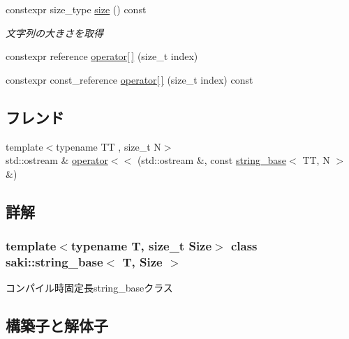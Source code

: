 \begin{DoxyCompactItemize}
\item 
constexpr size\+\_\+type \mbox{\hyperlink{classsaki_1_1string__base_ab243475d76d7abe879972787c590578e}{size}} () const
\begin{DoxyCompactList}\small\item\em 文字列の大きさを取得 \end{DoxyCompactList}\item 
constexpr reference \mbox{\hyperlink{classsaki_1_1string__base_acd4fb28d0f27242ecc038bab75018f3d}{operator\mbox{[}$\,$\mbox{]}}} (size\+\_\+t index)
\item 
constexpr const\+\_\+reference \mbox{\hyperlink{classsaki_1_1string__base_a738a15596baa6e6ade3322ce5dea9bea}{operator\mbox{[}$\,$\mbox{]}}} (size\+\_\+t index) const
\end{DoxyCompactItemize}
\subsection*{フレンド}
\begin{DoxyCompactItemize}
\item 
{\footnotesize template$<$typename TT , size\+\_\+t N$>$ }\\std\+::ostream \& \mbox{\hyperlink{classsaki_1_1string__base_af065456d5712bf52d3f09d973a6511ad}{operator$<$$<$}} (std\+::ostream \&, const \mbox{\hyperlink{classsaki_1_1string__base}{string\+\_\+base}}$<$ TT, N $>$ \&)
\end{DoxyCompactItemize}


\subsection{詳解}
\subsubsection*{template$<$typename T, size\+\_\+t Size$>$\newline
class saki\+::string\+\_\+base$<$ T, Size $>$}

コンパイル時固定長string\+\_\+baseクラス 

\subsection{構築子と解体子}
\mbox{\label{classsaki_1_1string__base_a17d98d62506a1f6eb04f210498bcaba0}} 

